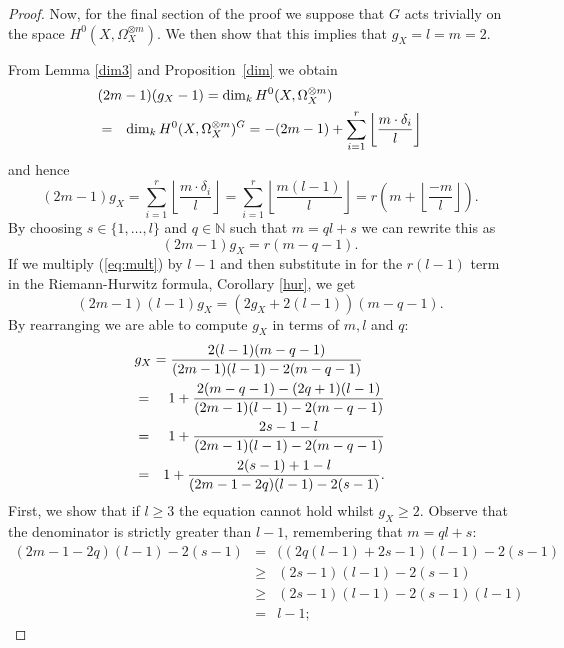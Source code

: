 \documentclass[draft, 11pt]{article} %
\theoremstyle{plain}
\theoremstyle{remark}
\begin{document}
\begin{proof}
    Now, for the final section of the proof we suppose that $G$ acts trivially on the space $H^0(X,\Omega_X^{\otimes m})$.
    We then show that this implies that $g_X=l=m=2$.
    
    
    From Lemma \ref{dim3} and Proposition~\ref{dim} we obtain
      \begin{eqnarray*}
	\lefteqn{(2m-1)(g_X-1)=\dim_kH^0(X,\Omega_X^{\otimes m})} \\
	& = & \dim_kH^0(X,\Omega_X^{\otimes m})^G=-(2m-1)+\sum_{i=1}^r \left\lfloor \frac{m\cdot \delta_i}{l} \right\rfloor
      \end{eqnarray*}
    and hence
      \begin{equation*}
	(2m-1)g_X = \sum_{i=1}^r \left\lfloor \frac{m\cdot \delta_i}{l} \right\rfloor
	= \sum_{i=1}^r \left\lfloor \frac{m(l-1)}{l} \right\rfloor
	= r\left( m+\left\lfloor \frac{-m}{l} \right\rfloor \right).
      \end{equation*}
    By choosing $s\in \{1,\ldots ,l\}$ and $q\in \mathbb{N}$ such that $m=ql+s$ we can rewrite this as
      \begin{equation}\label{eq:mult}
	(2m-1)g_X=r(m-q-1).
      \end{equation}
    If we multiply (\ref{eq:mult}) by $l-1$ and then substitute in for the $r(l-1)$ term in the Riemann-Hurwitz formula, Corollary \ref{hur}, we get
      \begin{equation*}
	(2m-1)(l-1)g_X=(2g_X+2(l-1))(m-q-1).
      \end{equation*}
    By rearranging we are able to compute $g_X$ in terms of $m,l$ and $q$:
      \begin{eqnarray*}
	\lefteqn{g_X = \frac{2(l-1)(m-q-1)}{(2m-1)(l-1)-2(m-q-1)}} \\
	& = & 1 + \frac{2(m-q-1)-(2q+1)(l-1)}{(2m-1)(l-1)-2(m-q-1)} \\
	& = & 1 + \frac{2s-1-l}{(2m-1)(l-1)-2(m-q-1)}  \\
	& = & 1 + \frac{2(s-1)+1-l}{(2m-1-2q)(l-1)-2(s-1)}. 
      \end{eqnarray*}
    First, we show that if $l\geq 3$ the equation cannot hold whilst $g_X\geq 2$.
    Observe that the denominator is strictly greater than $l-1$, remembering that $m=ql+s$:
      \begin{eqnarray*}
	(2m-1-2q)(l-1)-2(s-1) & = & ((2q(l-1)+2s-1)(l-1)-2(s-1) \\
	& \geq & (2s-1)(l-1)-2(s-1) \\
	& \geq & (2s-1)(l-1)-2(s-1)(l-1) \\
	& = & l-1;

\end{eqnarray*}
\end{proof}
\end{document}
